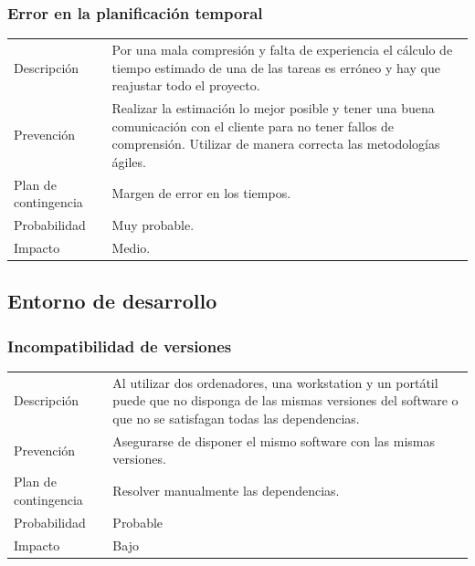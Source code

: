 \subsubsection{Error en la planificaci\'{o}n temporal}
\begin{table}[H]
    \begin{center}
        \begin{tabular}{l p{8cm}}
            Descripci\'{o}n                 & Por una mala compresi\'on y falta de experiencia el 
            c\'alculo
            de tiempo estimado de una de las tareas es err\'oneo y hay que reajustar todo el 
            proyecto. \\
            Prevenci\'{o}n                  & Realizar la estimación lo mejor posible y tener una 
            buena
            								  comunicaci\'on con el cliente para no tener fallos 
            								  de comprensión. Utilizar de manera 
            								  correcta las metodolog\'ias \'agiles. \\ 
            Plan de contingencia            & Margen de error en los tiempos. \\
            Probabilidad                    & Muy probable. \\
            Impacto                         & Medio. \\
        \end{tabular}
    \end{center}
    
\end{table}
\subsection{Entorno de desarrollo}
\subsubsection{Incompatibilidad de versiones}
\begin{table}[H]
    \begin{center}
        \begin{tabular}{l p{8cm}}
            Descripci\'{o}n                 & Al utilizar dos ordenadores, una workstation y un port\'{a}til puede que no 
            								  disponga de las mismas versiones del software o que no se satisfagan todas las 
            								  dependencias. \\
            Prevenci\'{o}n                  & Asegurarse de disponer el mismo software con las mismas versiones. \\ 
            Plan de contingencia            & Resolver manualmente las dependencias. \\
            Probabilidad                    & Probable \\
            Impacto                         & Bajo\\
        \end{tabular}
    \end{center}
    
\end{table}
